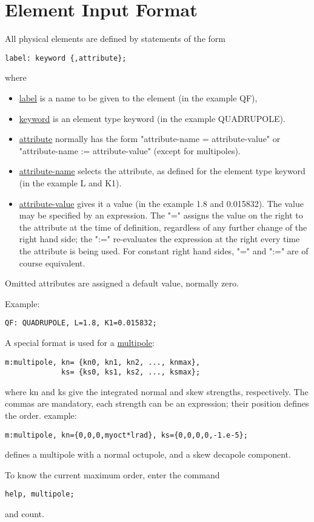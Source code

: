 
\section{Element Input Format}
All physical elements are defined by statements of the form 
\begin{verbatim}
label: keyword {,attribute};
\end{verbatim} 
where 
\begin{itemize}
	\item \href{label.html}{label} is a name to be given to the element (in the example QF), 
	\item \href{keyword.html}{keyword} is an element type keyword (in the example QUADRUPOLE). 
	\item \href{attribute.html}{attribute} normally has the form
          "attribute-name = attribute-value" or
          "attribute-name := attribute-value" (except for multipoles).  
	\item \href{label.html}{attribute-name} selects the attribute,
          as defined for the element type keyword (in the example L and
          K1).  
	\item \href{attribute.html}{attribute-value} gives it a value
          (in the example 1.8 and 0.015832). The value may be specified
          by an expression. The "=" assigns the value on the right to
          the attribute at the time of definition, regardless of any
          further change of the right hand side; the ":=" re-evaluates
          the expression at the right every time the attribute is being
          used. For constant right hand sides, "=" and ":=" are of
          course equivalent.  
\end{itemize} 

Omitted attributes are assigned a default value, normally zero. 

Example: 
\begin{verbatim}
QF: QUADRUPOLE, L=1.8, K1=0.015832;
\end{verbatim} 

A special format is used for a \href{multipole.html}{multipole}: 
\begin{verbatim}
m:multipole, kn= {kn0, kn1, kn2, ..., knmax},
             ks= {ks0, ks1, ks2, ..., ksmax};
\end{verbatim} 
where kn and ks give the integrated normal and skew strengths,
respectively. The commas are mandatory, each strength can be an
expression; their position defines the order. example:  
\begin{verbatim}
m:multipole, kn={0,0,0,myoct*lrad}, ks={0,0,0,0,-1.e-5};
\end{verbatim} 
defines a multipole with a normal octupole, and a skew decapole component. 

To know the current maximum order, enter the command 
\begin{verbatim}
help, multipole;
\end{verbatim} 
and count. 

